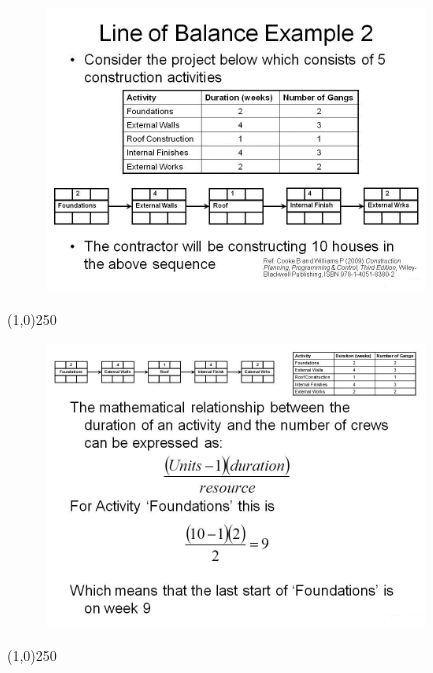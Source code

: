 \begin{frame}
\begin{figure}
	\centering
		\includegraphics[width = 10.0cm]{oldnotes/Slide256.jpg}
\end{figure}
\end{frame}
\begin{center}\line(1,0){250}\end{center}






\begin{frame}
\begin{figure}
	\centering
		\includegraphics[width = 10.0cm]{oldnotes/Slide257.jpg}
\end{figure}
\end{frame}
\begin{center}\line(1,0){250}\end{center}






